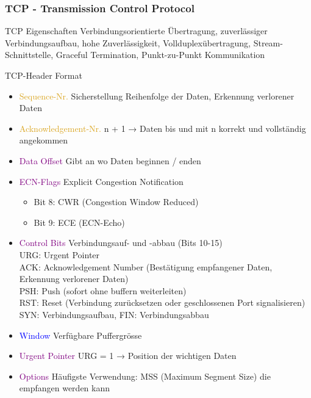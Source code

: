 \subsubsection{TCP - Transmission Control Protocol}

\begin{definition}{TCP Eigenschaften} 
    Verbindungsorientierte Übertragung, zuverlässiger Verbindungsaufbau, hohe Zuverlässigkeit, Vollduplexübertragung, Stream-Schnittstelle, Graceful Termination, Punkt-zu-Punkt Kommunikation
\end{definition}

\begin{concept}{TCP-Header Format}
    \begin{itemize}
        \item \textcolor{Goldenrod}{Sequence-Nr.} Sicherstellung Reihenfolge der Daten, Erkennung verlorener Daten
        \item \textcolor{Goldenrod}{Acknowledgement-Nr.} n + 1 → Daten bis und mit n korrekt und vollständig angekommen
        \item \textcolor{purple}{Data Offset} Gibt an wo Daten beginnen / enden
        \item \textcolor{purple}{ECN-Flags} Explicit Congestion Notification
        \begin{itemize}
            \item Bit 8: CWR (Congestion Window Reduced)
            \item Bit 9: ECE (ECN-Echo)
        \end{itemize}
        \item \textcolor{purple}{Control Bits} Verbindungsauf- und -abbau (Bits 10-15)\\
        URG: Urgent Pointer\\
        ACK: Acknowledgement Number (Bestätigung empfangener Daten, Erkennung verlorener Daten)\\
        PSH: Push (sofort ohne buffern weiterleiten)\\
        RST: Reset (Verbindung zurücksetzen oder geschlossenen Port signalisieren)\\
        SYN: Verbindungsaufbau,
        FIN: Verbindungsabbau
        \item \textcolor{blue}{Window} Verfügbare Puffergrösse 
        \item \textcolor{purple}{Urgent Pointer} URG = 1 → Position der wichtigen Daten
        \item \textcolor{purple}{Options} Häufigste Verwendung: MSS (Maximum Segment Size) die empfangen werden kann

\end{itemize}
\end{concept}
